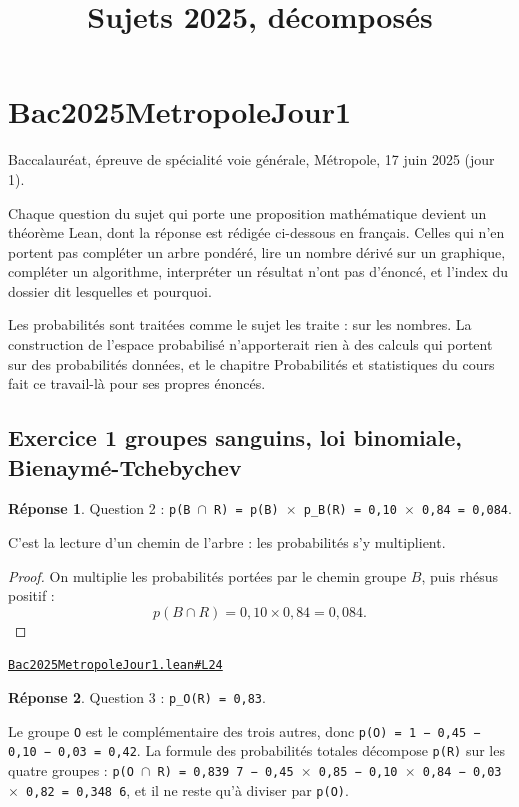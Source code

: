 \documentclass[11pt,a4paper]{article}
\title{Sujets 2025, décomposés}
\date{}
\theoremstyle{definition}
\theoremstyle{plain}
\theoremstyle{definition}
\newtheorem*{reponse}{Réponse}
\newcommand{\source}[2]{\par\smallskip\noindent\hfill{\footnotesize\href{#1}{\texttt{#2}}}\par\smallskip}
\begin{document}
\maketitle
\sloppy

\section{Bac2025MetropoleJour1}

\noindent
Baccalauréat, épreuve de spécialité \textemdash{} voie générale, Métropole, 17 juin 2025 (jour 1).

Chaque question du sujet qui porte une proposition mathématique devient un théorème
Lean, dont la réponse est rédigée ci-dessous en français. Celles qui n'en portent pas \textemdash{} compléter un arbre pondéré, lire un nombre
dérivé sur un graphique, compléter un algorithme, interpréter un résultat \textemdash{} n'ont pas
d'énoncé, et l'index du dossier dit lesquelles et pourquoi.

Les probabilités sont traitées comme le sujet les traite : sur les nombres. La
construction de l'espace probabilisé n'apporterait rien à des calculs qui portent sur
des probabilités données, et le chapitre \og{} Probabilités et statistiques \fg{} du cours
fait ce travail-là pour ses propres énoncés.

\subsection{Exercice 1 \textemdash{} groupes sanguins, loi binomiale, Bienaymé-Tchebychev}

\begin{reponse}
Question 2 : \texttt{p(B \(\cap\) R) = p(B) \(\times\) p\_B(R) = 0,10 \(\times\) 0,84 = 0,084}.

C'est la lecture d'un chemin de l'arbre : les probabilités s'y multiplient.
\end{reponse}
\begin{proof}
On multiplie les probabilités portées par le chemin \og{} groupe $B$, puis rhésus
positif \fg{} :
\[ p(B \cap R) = 0{,}10 \times 0{,}84 = 0{,}084 . \]
\end{proof}
\source{https://github.com/Commutator-IO/learn-lean/blob/main/exams/2025/Bac2025MetropoleJour1.lean\#L24}{Bac2025MetropoleJour1.lean\#L24}

\begin{reponse}
Question 3 : \texttt{p\_O(R) = 0,83}.

Le groupe \texttt{O} est le complémentaire des trois autres, donc \texttt{p(O) = 1 − 0,45 − 0,10 −
0,03 = 0,42}. La formule des probabilités totales décompose \texttt{p(R)} sur les quatre
groupes : \texttt{p(O \(\cap\) R) = 0,839 7 − 0,45 \(\times\) 0,85 − 0,10 \(\times\) 0,84 − 0,03 \(\times\) 0,82 = 0,348 6}, et
il ne reste qu'à diviser par \texttt{p(O)}.
\end{reponse}
\end{document}
